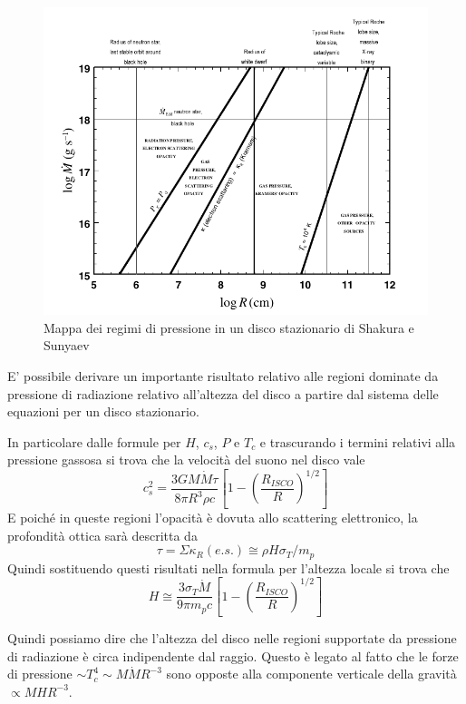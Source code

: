 \documentclass[a4paperbi]{article}
\begin{document}
	\begin{figure}[H]
		\centering
		\includegraphics[width=1\linewidth]{MappaPressione}
		\caption{Mappa dei regimi di pressione in un disco stazionario di Shakura e Sunyaev}
		\label{fig:MappaPressione}
	\end{figure}
	
	E' possibile derivare un importante risultato relativo alle regioni dominate da pressione di radiazione relativo all'altezza del disco a partire dal sistema delle equazioni per un disco stazionario.
	
	In particolare dalle formule per $H$, $c_s$, $P$ e $T_c$ e trascurando i termini relativi alla pressione gassosa si trova che la velocità del suono nel disco vale
	\begin{equation*}
		c_s^2=\frac{3GM\dot{M}\tau}{8\pi R^3\rho c}\left[1-\left(\frac{R_{ISCO}}{R}\right)^{1/2}\right]
	\end{equation*}
	E poiché in queste regioni l'opacità è dovuta allo scattering elettronico, la profondità ottica sarà descritta da
	\begin{equation*}
		\tau=\Sigma\kappa_R(e.s.)\cong\rho H\sigma_T/m_p
	\end{equation*}
	Quindi sostituendo questi risultati nella formula per l'altezza locale si trova che
	\begin{equation}
		H\cong\frac{3\sigma_T\dot{M}}{9\pi m_pc}\left[1-\left(\frac{R_{ISCO}}{R}\right)^{1/2}\right]
	\end{equation}
		 
	Quindi possiamo dire che l'altezza del disco nelle regioni supportate da pressione di radiazione è circa indipendente dal raggio. Questo è legato al fatto che le forze di pressione $\sim T_c^4\sim M\dot{M}R^{-3}$ sono opposte alla componente verticale della gravità $\propto MHR^{-3}$.
	
\end{document}
